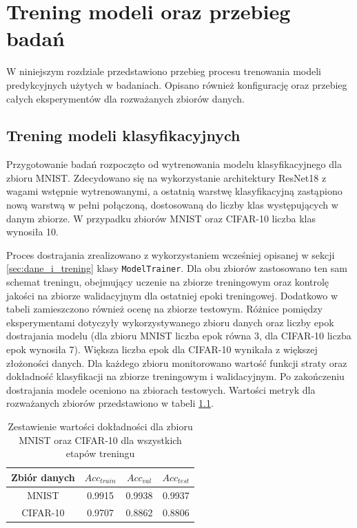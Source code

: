 \chapter{Trening modeli oraz przebieg badań}

W niniejszym rozdziale przedstawiono przebieg procesu trenowania modeli predykcyjnych użytych w badaniach. Opisano również konfigurację oraz przebieg całych eksperymentów dla rozważanych zbiorów danych.

\section{Trening modeli klasyfikacyjnych}
\label{sec:trening}

Przygotowanie badań rozpoczęto od wytrenowania modelu klasyfikacyjnego dla zbioru MNIST. Zdecydowano się na wykorzystanie architektury ResNet18 z wagami wstępnie wytrenowanymi, a ostatnią warstwę klasyfikacyjną zastąpiono nową warstwą w pełni połączoną, dostosowaną do liczby klas występujących w danym zbiorze. W przypadku zbiorów MNIST oraz CIFAR-10 liczba klas wynosiła 10.

Proces dostrajania zrealizowano z wykorzystaniem wcześniej opisanej w sekcji \ref{sec:dane_i_trening} klasy \texttt{ModelTrainer}. Dla obu zbiorów zastosowano ten sam schemat treningu, obejmujący uczenie na zbiorze treningowym oraz kontrolę jakości na zbiorze walidacyjnym dla ostatniej epoki treningowej. Dodatkowo w tabeli zamieszczono również ocenę na zbiorze testowym. Różnice pomiędzy eksperymentami dotyczyły wykorzystywanego zbioru danych oraz liczby epok dostrajania modelu (dla zbioru MNIST liczba epok równa 3, dla CIFAR-10 liczba epok wynosiła 7). Większa liczba epok dla CIFAR-10 wynikała z większej złożoności danych.
Dla każdego zbioru monitorowano wartość funkcji straty oraz dokładność klasyfikacji na zbiorze treningowym i walidacyjnym. Po zakończeniu dostrajania modele oceniono na zbiorach testowych. Wartości metryk dla rozważanych zbiorów przedstawiono w tabeli \ref{tab:metryki_dla_treningu}.

\begin{table}[H]
\centering
\caption{Zestawienie wartości dokładności dla zbioru MNIST oraz CIFAR-10 dla wszystkich etapów treningu}
\label{tab:metryki_dla_treningu}
\begin{tabular}{cccc}
\toprule
Zbiór danych & $Acc_{train}$ & $Acc_{val}$ & $Acc_{test}$ \\
\midrule
MNIST    &  0.9915 & 0.9938 & 0.9937 \\
CIFAR-10 &  0.9707 & 0.8862 & 0.8806 \\
\bottomrule
\end{tabular}
\end{table}

